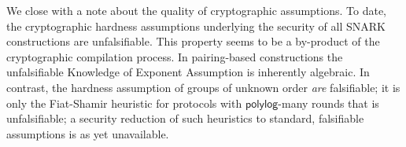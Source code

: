 We close with a note about the quality of cryptographic assumptions. To date, the cryptographic hardness assumptions underlying the security of all SNARK constructions are unfalsifiable. This property seems to be a by-product of the cryptographic compilation process. In pairing-based constructions the unfalsifiable Knowledge of Exponent Assumption is inherently algebraic. In contrast, the hardness assumption of groups of unknown order \emph{are} falsifiable; it is only the Fiat-Shamir heuristic for protocols with $\mathsf{polylog}$-many rounds that is unfalsifiable; a security reduction of such heuristics to standard, falsifiable assumptions is as yet unavailable.